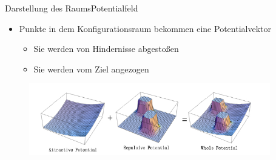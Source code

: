 \documentclass[t,aspectratio=169,dvipsnames]{beamer}
\begin{document}
\begin{frame}{Darstellung des Raums}{Potentialfeld}

	\begin{itemize}
		\item Punkte in dem Konfigurationsraum bekommen eine Potentialvektor
		\begin{itemize}
			\item Sie werden von Hindernisse abgestoßen
			\item Sie werden vom Ziel angezogen
			
		\end{itemize}
	\end{itemize}
	
	\begin{figure}
		\includegraphics[width=10.5cm]{images/Potential_Field.png}
	
	\end{figure}
\end{frame}
\end{document}
